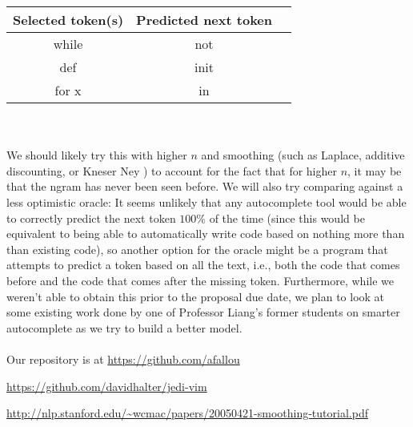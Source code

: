 \documentclass[10.75pt]{article}
\begin{document}
 \begin{tabular}{c c c} 
Selected token(s) & Predicted next token & \\
\hline %
while & not\\ %
def & init\\
for x & in\\
\end{tabular}\\\\
We should likely try this with higher $n$ and smoothing (such as Laplace, additive discounting, or Kneser Ney \cite{smooth}) to account for the fact that for higher $n$, it may be that the ngram has never been seen before.  
We will also try comparing against a less optimistic oracle: It seems unlikely that any autocomplete tool would be able to correctly predict the next token $100\%$ of the time (since this would be equivalent to being able to automatically write code based on nothing more than than existing code), so another option for the oracle might be a program that attempts to predict a token based on all the text, i.e., both the code that comes before and the code that comes after the missing token. Furthermore, while we weren't able to obtain this prior to the proposal due date, we plan to look at some existing work done by one of Professor Liang's former students on smarter autocomplete as we try to build a better model.
\\\\
Our repository is at \url{https://github.com/afallou}

\begin{thebibliography}{9}

 \url{https://github.com/davidhalter/jedi-vim}

 \url{http://nlp.stanford.edu/~wcmac/papers/20050421-smoothing-tutorial.pdf}

\end{thebibliography}
\end{document}
